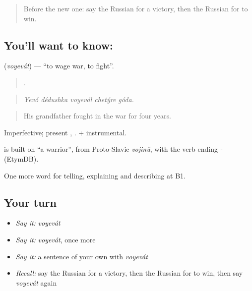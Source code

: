 \label{lesson:RU-C324-voyevat}



\begin{quote}
Before the new one: say the Russian for a victory, then the Russian for to win.
\end{quote}

\subsection*{You'll want to know: }
\textbf{} (\emph{voyevát}) — \textquotedblleft{}to wage war, to fight\textquotedblright{}.

\begin{quote}
    .
\end{quote}

\begin{quote}
\emph{Yevó dédushka voyevál chetýre góda.}
\end{quote}

\begin{quote}
His grandfather fought in the war for four years.
\end{quote}

Imperfective; present \emph{}, \emph{}. \emph{ } + instrumental.

\begin{cousinweb}
\emph{} is built on \emph{} \textquotedblleft{}a warrior\textquotedblright{}, from Proto-Slavic \emph{vojinŭ}, with the verb ending \emph{-} (EtymDB).
\end{cousinweb}

\begin{grammarlens}[title={What you've built}]
One more word for telling, explaining and describing at B1.
\end{grammarlens}

\subsection*{Your turn}
\begin{itemize}
\raggedright
  \item \emph{Say it:} \emph{voyevát}
  \item \emph{Say it:} \emph{voyevát}, once more
  \item \emph{Say it:} a sentence of your own with \emph{voyevát}
  \item \emph{Recall:} say the Russian for a victory, then the Russian for to win, then say \emph{voyevát} again
\end{itemize}

